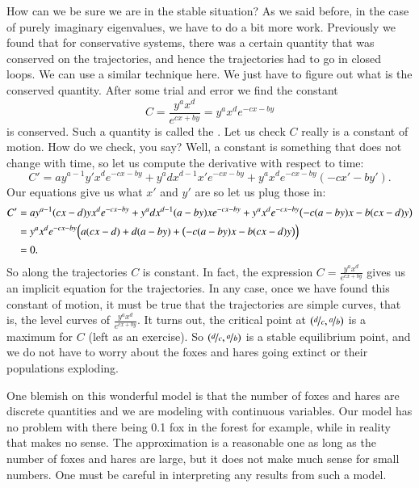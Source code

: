 \documentclass[12pt]{book}
\begin{document}
How can we be sure we are in the stable situation?
As we said before, in the case of purely imaginary eigenvalues, we have to
do a bit more work.  Previously we found that for conservative systems,
there was a certain quantity that was conserved on the trajectories, and
hence the trajectories had to go in closed loops.
We can use a similar technique here.  We just have to figure out what is the
conserved quantity.  After some trial and error we find the
constant
\begin{equation*}
C = \frac{y^a x^d}{e^{cx+by}} = y^a x^d e^{-cx-by}
\end{equation*}
is conserved.  Such a quantity is called the \emph{}.  Let us check $C$ really is a constant of motion.  How do we check, you say?  Well, a constant is
something that does not change with time, so let us compute the derivative
with respect to time:
\begin{equation*}
C' = 
a y^{a-1}y' x^d e^{-cx-by}
+
y^a d x^{d-1} x' e^{-cx-by}
+
y^a x^d e^{-cx-by} (-cx'-by') .
\end{equation*}
Our equations give us what $x'$ and $y'$ are so let us plug those in:
\begin{equation*}
\begin{split}
C' & = 
a y^{a-1} (cx-d)y x^d e^{-cx-by}
+
y^a d x^{d-1} (a-by)x e^{-cx-by}
+
y^a x^d e^{-cx-by} \bigl(-c(a-by)x-b(cx-d)y\bigr)
\\
& =
y^a x^d e^{-cx-by}
\Bigl(
a (cx-d)
+
d (a-by)
+
\bigl(-c(a-by)x-b(cx-d)y\bigr) \Bigr)
\\
& = 
0 .
\end{split}
\end{equation*}
So along the trajectories $C$ is constant.  In fact, the expression $C =
\frac{y^a x^d}{e^{cx+by}}$ gives us an implicit equation for the
trajectories.  In any case, once we have found this constant of motion,
it must be true that the
trajectories are simple curves, that is, the level curves of
$\frac{y^a x^d}{e^{cx+by}}$.  It turns out, the critical point at
$(\nicefrac{d}{c},\nicefrac{a}{b})$ is a maximum for $C$ (left as an exercise).
So $(\nicefrac{d}{c},\nicefrac{a}{b})$ is a stable equilibrium point, and 
we do not have to worry about the foxes and hares going extinct or their
populations exploding.

One blemish on this wonderful model is that the number of foxes and hares
are discrete quantities and we are modeling with continuous variables.  Our
model has no problem with there being 0.1 fox in the forest for example,
while in reality that makes no sense.  The approximation is a reasonable one
as long as the number of foxes and hares are large, but it does not make
much sense for small numbers.  One must be careful in interpreting any
results from such a model.
\end{document}
